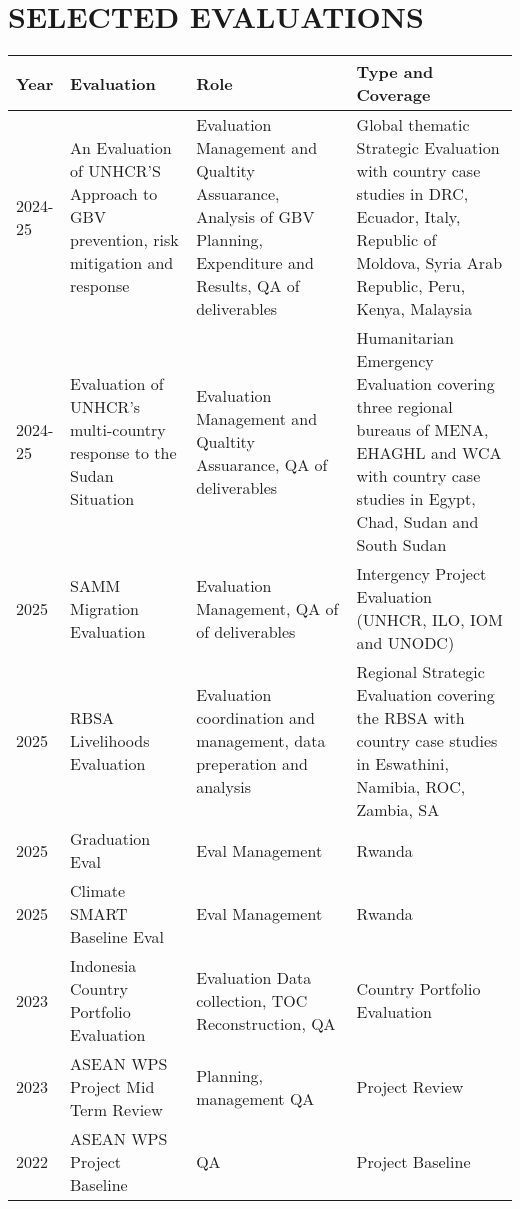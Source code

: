 \documentclass[
  10pt,
]{article}
\begin{document}
\section{SELECTED EVALUATIONS}
\begin{tabularx}{\textwidth}{|l|X|X|X|}
\hline
Year & Evaluation & Role & Type and Coverage \\
\hline
2024-25 & An Evaluation of UNHCR'S Approach to GBV prevention, risk mitigation and response & Evaluation Management and Qualtity Assuarance, Analysis of GBV Planning, Expenditure and Results, QA of deliverables & Global thematic Strategic Evaluation with country case studies in DRC, Ecuador, Italy, Republic of Moldova, Syria Arab Republic, Peru, Kenya, Malaysia\\
2024-25 & Evaluation of UNHCR's multi-country response to the Sudan Situation & Evaluation Management and Qualtity Assuarance, QA of deliverables & Humanitarian Emergency Evaluation covering three regional bureaus of MENA, EHAGHL and WCA with country case studies in Egypt, Chad, Sudan and South Sudan \\
2025 & SAMM Migration Evaluation & Evaluation Management, QA of of deliverables & Intergency Project Evaluation (UNHCR, ILO, IOM and UNODC) \\
2025 & RBSA Livelihoods Evaluation & Evaluation coordination and management, data preperation and analysis & Regional Strategic Evaluation covering the RBSA with country case studies in Eswathini, Namibia, ROC, Zambia, SA \\
2025 & Graduation Eval & Eval Management & Rwanda \\2025 & Climate SMART Baseline Eval & Eval Management & Rwanda \\ 2023 & Indonesia Country Portfolio Evaluation & Evaluation Data collection, TOC Reconstruction, QA & Country Portfolio Evaluation \\ 2023 & ASEAN WPS Project Mid Term Review & Planning, management QA & Project Review \\
2022 & ASEAN WPS Project Baseline & QA & Project Baseline \\
\hline
\end{tabularx}
\end{document}
